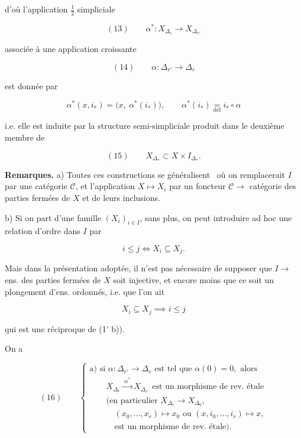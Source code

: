 \documentclass[11pt,a4paper]{article}
\begin{document}
d'où l'application $\tfrac{1}{2}$ simpliciale

\[
  (13) \qquad \alpha^{*} : X_{\Delta_r} \longrightarrow X_{\Delta_{r'}}
\]

associée à une application croissante

\[
  (14) \qquad \alpha : \Delta_{r'} \longrightarrow \Delta_r
\]

est donnée par

\[
  \alpha^{*}(x, i_{*}) = \bigl( x,\ \alpha^{*}(i_{*}) \bigr),
  \qquad \alpha^{*}(i_{*}) \underset{\text{déf}}{=} i_{*} \circ \alpha
\]

i.e. elle est induite par la structure semi-simpliciale produit dans le
deuxième membre de

\[
  (15) \qquad X_{\Delta_{*}} \subset X \times I_{\Delta_{*}} .
\]

\textbf{Remarques.} a) Toutes ces constructions se généralisent \ill\ où on
remplacerait  $I$ par une catégorie $\mathcal{C}$, et
l'application $X \mapsto X_i$ par un foncteur $\mathcal{C} \to$ catégorie des
parties fermées de $X$ et de leurs inclusions.

b) Si on part d'une famille $(X_i)_{i \in I}$,  sans plus, on
peut introduire ad hoc une relation d'ordre dans $I$ par \struck{\ill}

\[
  i \leq j \iff X_i \subseteq X_j .
\]

Mais dans la présentation adoptée, il n'est pas nécessaire de supposer que
 $I \to$ ens. des parties fermées de $X$ soit
injective, et encore moins que ce soit un plongement d'ens. ordonnés, i.e. que
l'on ait

\[
  X_i \subseteq X_j \implies i \leq j
\]

qui est une réciproque de (1' b)).

On a

\[
  (16) \qquad
  \begin{cases}
    \text{a) si } \alpha : \Delta_{r'} \to \Delta_r
      \text{ est tel que } \alpha(0) = 0, \text{ alors} \\
    \qquad X_{\Delta_r} \xrightarrow{\ \alpha^{*}\ } X_{\Delta_{r'}}
      \text{ est un morphisme de rev. étale} \\
    \qquad \text{(en particulier } X_{\Delta_r} \to X_{\Delta_0}, \\
    \qquad\quad (x_0, \ldots, x_r) \mapsto x_0
      \text{ ou } (x, i_0, \ldots, i_r) \mapsto x, \\
    \qquad\quad \text{est un morphisme de rev. étale).}
  \end{cases}
\]
\end{document}
